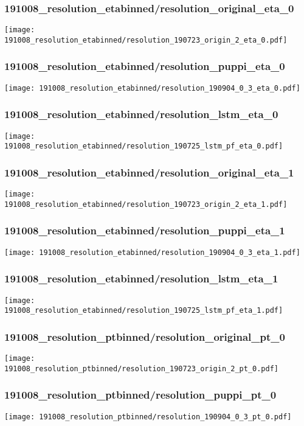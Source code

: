 \begin{frame}
   \frametitle{\small 191008\_resolution\_etabinned/resolution\_original\_eta\_0}
   \centering
   \texttt{[image: 191008\_resolution\_etabinned/resolution\_190723\_origin\_2\_eta\_0.pdf]}
\end{frame}

\begin{frame}
   \frametitle{\small 191008\_resolution\_etabinned/resolution\_puppi\_eta\_0}
   \centering
   \texttt{[image: 191008\_resolution\_etabinned/resolution\_190904\_0\_3\_eta\_0.pdf]}
\end{frame}

\begin{frame}
   \frametitle{\small 191008\_resolution\_etabinned/resolution\_lstm\_eta\_0}
   \centering
   \texttt{[image: 191008\_resolution\_etabinned/resolution\_190725\_lstm\_pf\_eta\_0.pdf]}
\end{frame}

\begin{frame}
   \frametitle{\small 191008\_resolution\_etabinned/resolution\_original\_eta\_1}
   \centering
   \texttt{[image: 191008\_resolution\_etabinned/resolution\_190723\_origin\_2\_eta\_1.pdf]}
\end{frame}

\begin{frame}
   \frametitle{\small 191008\_resolution\_etabinned/resolution\_puppi\_eta\_1}
   \centering
   \texttt{[image: 191008\_resolution\_etabinned/resolution\_190904\_0\_3\_eta\_1.pdf]}
\end{frame}

\begin{frame}
   \frametitle{\small 191008\_resolution\_etabinned/resolution\_lstm\_eta\_1}
   \centering
   \texttt{[image: 191008\_resolution\_etabinned/resolution\_190725\_lstm\_pf\_eta\_1.pdf]}
\end{frame}

\begin{frame}
   \frametitle{\small 191008\_resolution\_ptbinned/resolution\_original\_pt\_0}
   \centering
   \texttt{[image: 191008\_resolution\_ptbinned/resolution\_190723\_origin\_2\_pt\_0.pdf]}
\end{frame}

\begin{frame}
   \frametitle{\small 191008\_resolution\_ptbinned/resolution\_puppi\_pt\_0}
   \centering
   \texttt{[image: 191008\_resolution\_ptbinned/resolution\_190904\_0\_3\_pt\_0.pdf]}
\end{frame}

